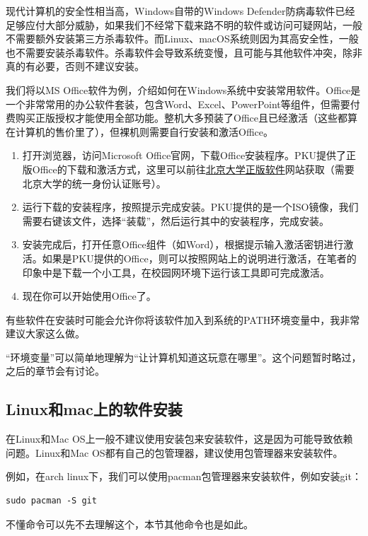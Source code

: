 现代计算机的安全性相当高，Windows自带的Windows Defender防病毒软件已经足够应付大部分威胁，如果我们不经常下载来路不明的软件或访问可疑网站，一般不需要额外安装第三方杀毒软件。而Linux、macOS系统则因为其高安全性，一般也不需要安装杀毒软件。杀毒软件会导致系统变慢，且可能与其他软件冲突，除非真的有必要，否则不建议安装。

我们将以MS Office软件为例，介绍如何在Windows系统中安装常用软件。Office是一个非常常用的办公软件套装，包含Word、Excel、PowerPoint等组件，但需要付费购买正版授权才能使用全部功能。整机大多预装了Office且已经激活（这些都算在计算机的售价里了），但裸机则需要自行安装和激活Office。

\begin{enumerate}
    \item 打开浏览器，访问Microsoft Office官网，下载Office安装程序。PKU提供了正版Office的下载和激活方式，这里可以前往\href{software.pku.edu.cn}{北京大学正版软件}网站获取（需要北京大学的统一身份认证账号）。
    \item 运行下载的安装程序，按照提示完成安装。PKU提供的是一个ISO镜像，我们需要右键该文件，选择“装载”，然后运行其中的安装程序，完成安装。
    \item 安装完成后，打开任意Office组件（如Word），根据提示输入激活密钥进行激活。如果是PKU提供的Office，则可以按照网站上的说明进行激活，在笔者的印象中是下载一个小工具，在校园网环境下运行该工具即可完成激活。
    \item 现在你可以开始使用Office了。
\end{enumerate}

有些软件在安装时可能会允许你将该软件加入到系统的PATH环境变量中，我非常建议大家这么做。

\begin{tip}
  “环境变量”可以简单地理解为“让计算机知道这玩意在哪里”。这个问题暂时略过，之后的章节会有讨论。
\end{tip}

\subsection{Linux和mac上的软件安装}

在Linux和Mac OS上一般不建议使用安装包来安装软件，这是因为可能导致依赖问题。Linux和Mac OS都有自己的包管理器，建议使用包管理器来安装软件。

例如，在arch linux下，我们可以使用pacman包管理器来安装软件，例如安装git：
\begin{verbatim}
sudo pacman -S git
\end{verbatim}
不懂命令可以先不去理解这个，本节其他命令也是如此。

